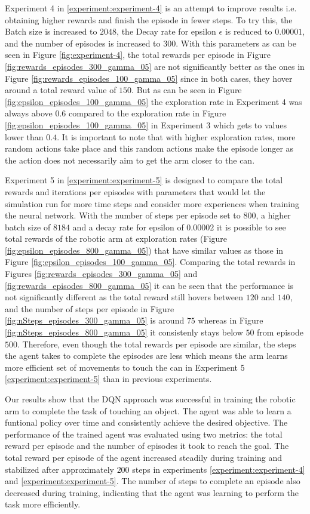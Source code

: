 \documentclass[12pt,oneside]{article}
\begin{document}
Experiment 4 in \ref{experiment:experiment-4} is an attempt to improve results i.e. obtaining higher rewards and finish the episode in fewer steps. To try this, the Batch size is increased to $2048$, the Decay rate for epsilon $\epsilon$ is reduced to $0.00001$, and the number of episodes is increased to $300$. With this parameters as can be seen in Figure \ref{fig:experiment-4}, the total rewards per episode in Figure \ref{fig:rewards_episodes_300_gamma_05} are not significantly better as the ones in Figure \ref{fig:rewards_episodes_100_gamma_05} since in both cases, they hover around a total reward value of $150$. But as can be seen in Figure \ref{fig:epsilon_episodes_100_gamma_05} the exploration rate in Experiment 4 was always above $0.6$ compared to the exploration rate in Figure \ref{fig:epsilon_episodes_100_gamma_05} in Experiment 3 which gets to values lower than $0.4$. It is important to note that with higher exploration rates, more random actions take place and this random actions make the episode longer as the action does not necessarily aim to get the arm closer to the can. 

Experiment 5 in \ref{experiment:experiment-5} is designed to compare the total rewards and iterations per episodes with parameters that would let the simulation run for more time steps and consider more experiences when training the neural network. With the number of steps per episode set to $800$, a higher batch size of $8184$ and a decay rate for epsilon of $0.00002$ it is possible to see total rewards of the robotic arm at exploration rates (Figure \ref{fig:epsilon_episodes_800_gamma_05}) that have similar values as those in Figure \ref{fig:epsilon_episodes_100_gamma_05}. Comparing the total rewards in Figures \ref{fig:rewards_episodes_300_gamma_05} and \ref{fig:rewards_episodes_800_gamma_05} it can be seen that the performance is not significantly different as the total reward still hovers between $120$ and $140$, and the number of steps per episode in Figure \ref{fig:nSteps_episodes_300_gamma_05} is around $75$ whereas in Figure \ref{fig:nSteps_episodes_800_gamma_05} it consistenly stays below $50$ from episode $500$. Therefore, even though the total rewards per episode are similar, the steps the agent takes to complete the episodes are less which means the arm learns more efficient set of movements to touch the can in Experiment 5 \ref{experiment:experiment-5} than in previous experiments.

Our results show that the DQN approach was successful in training the robotic arm to complete the task of touching an object. The agent was able to learn a funtional policy over time and consistently achieve the desired objective. The performance of the trained agent was evaluated using two metrics: the total reward per episode and the number of episodes it took to reach the goal. The total reward per episode of the agent increased steadily during training and stabilized after approximately $200$ steps in experiments \ref{experiment:experiment-4} and \ref{experiment:experiment-5}. The number of steps to complete an episode also decreased during training, indicating that the agent was learning to perform the task more efficiently.
\end{document}
